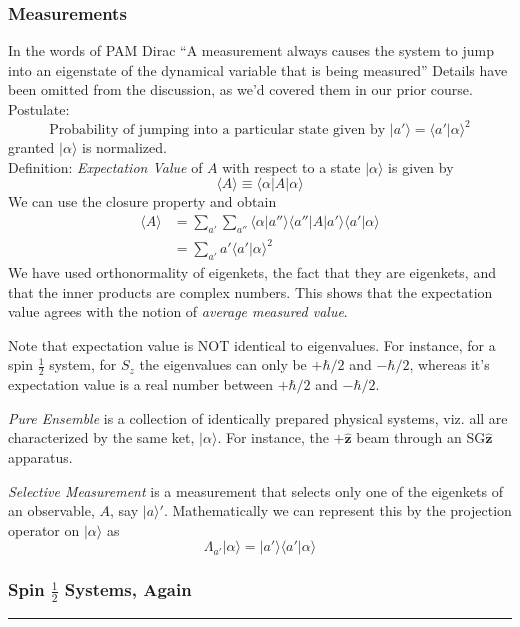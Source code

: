 \documentclass[12pt]{article}
\def\*#1{\boldsymbol{#1}}
\let\oldhat\hat
\renewcommand{\hat}[1]{\oldhat{\*{#1}}}
\def\ket#1{|#1 \rangle}
\def\inpr#1#2{\langle #1|#2 \rangle}
\def\braket#1#2#3{\langle#1|#2|#3\rangle}
\def\expval#1{\langle #1 \rangle}
\begin{document}
			\subsubsection{Measurements}
				In the words of PAM Dirac ``A measurement always causes the system to jump into an eigenstate of the dynamical variable that is being measured'' Details have been omitted from the discussion, as we'd covered them in our prior course.\\
				Postulate: 
				\begin{equation}
					\text{Probability of jumping into a particular state given by } \ket {a'} = \inpr {a'} \alpha ^2
				\end{equation}
				granted $\ket \alpha$ is normalized. \\
				Definition: \emph{Expectation Value} of $A$ with respect to a state $\ket \alpha$ is given by
				\begin{equation}
					 \expval A \equiv \braket \alpha A \alpha
				\end{equation}
				We can use the closure property and obtain
				\begin{align}
					\expval A 	&= \sum_{a'}\sum_{a''} \inpr \alpha {a''} \braket {a''} A {a'} \inpr {a'} \alpha \\
								&= \sum_{a'} a' \inpr {a'} \alpha ^2
				\end{align}
				We have used orthonormality of eigenkets, the fact that they are eigenkets, and that the inner products are complex numbers. This shows that the expectation value agrees with the notion of \emph{average measured value}.
				\par
				Note that expectation value is NOT identical to eigenvalues. For instance, for a spin $\frac 1 2$ system, for $S_z$ the eigenvalues can only be $+\hbar/2$ and $-\hbar/2$, whereas it's expectation value is a real number between $+\hbar/2$ and $-\hbar/2$.
				\par
				\emph{Pure Ensemble} is a collection of identically prepared physical systems, viz. all are characterized by the same ket, $\ket \alpha$. For instance, the $+ \hat z$ beam through an SG$\hat z$ apparatus.
				\par
				\emph{Selective Measurement} is a measurement that selects only one of the eigenkets of an observable, $A$, say $\ket a'$. Mathematically we can represent this by the projection operator on $\ket \alpha$ as
				\begin{equation}
					\Lambda_{a'}\ket \alpha = \ket {a'} \inpr{a'} \alpha
				\end{equation}
			\subsubsection{Spin $\frac 1 2$ Systems, Again}
\vspace{12pt}
\hrule
\end{document}

